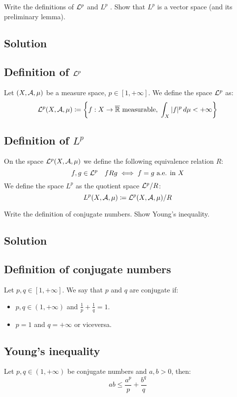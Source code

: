
\question
Write the definitions of $\mathcal{L}^p$ and $L^p$ . Show that $L^p$ is a vector space (and its preliminary lemma).

\subsection*{Solution}

\subsection{Definition of \texorpdfstring{$\mathcal{L}^p$}{Lp}}
Let $(X,\mathcal{A}, \mu)$ be a measure space, $p\in[1,+\infty]$. We define the space $\mathcal{L}^p$ as:
\[ \mathcal{L}^p(X,\mathcal{A}, \mu) \coloneqq \left\{ f:X\to\overline{\mathbb{R}} \text{ measurable}, \; \int_X |f|^p \, d\mu < +\infty \right\} \]

\subsection{Definition of \texorpdfstring{$L^p$}{Lp}}
On the space $\mathcal{L}^p(X,\mathcal{A}, \mu)$ we define the following equivalence relation $R$:
\[ f,g\in\mathcal{L}^p \quad f R g \iff f=g \text{ a.e. in } X \]
We define the space $L^p$ as the quotient space $\mathcal{L}^p/R$:
\[ L^p(X,\mathcal{A}, \mu) \coloneqq \mathcal{L}^p(X,\mathcal{A}, \mu)/R \]


\question
Write the definition of conjugate numbers. Show Young's inequality.

\subsection*{Solution}

\subsection{Definition of conjugate numbers}
Let $p,q\in[1,+\infty]$. We say that $p$ and $q$ are conjugate if:
\begin{itemize}
    \item $p,q \in (1,+\infty)$ and $\frac{1}{p}+\frac{1}{q}=1$.
    \item $p=1$ and $q=+\infty$ or viceversa.
\end{itemize}

\subsection{Young's inequality}
Let $p,q \in (1,+\infty)$ be conjugate numbers and $a,b > 0$, then:
\[ ab \leq \frac{a^p}{p} + \frac{b^q}{q} \]

